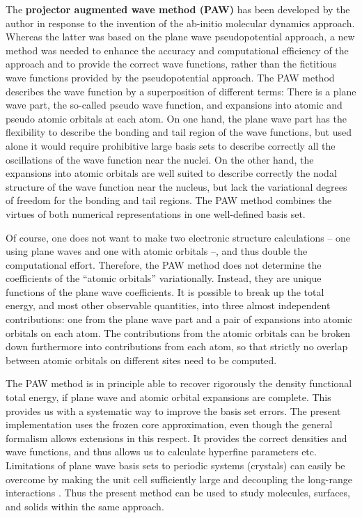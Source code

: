 \documentclass[final,12pt]{article}
\begin{document}
The {\bf projector augmented wave method (PAW)} \cite{PAW} has been
developed by the author in response to the invention of the ab-initio
molecular dynamics approach. Whereas the latter was based on the plane
wave pseudopotential approach, a new method was needed to enhance the
accuracy and computational efficiency of the approach and to provide
the correct wave functions, rather than the fictitious wave functions
provided by the pseudopotential approach.  The PAW method describes
the wave function by a superposition of different terms: There is a
plane wave part, the so-called pseudo wave function, and expansions
into atomic and pseudo atomic orbitals at each atom. On one hand, the
plane wave part has the flexibility to describe the bonding and tail
region of the wave functions, but used alone it would require
prohibitive large basis sets to describe correctly all the
oscillations of the wave function near the nuclei. On the other hand,
the expansions into atomic orbitals are well suited to describe
correctly the
nodal structure of the wave function near the nucleus, but
lack the variational degrees of freedom for the bonding and tail
regions.  The PAW method combines the virtues of both numerical
representations in one well-defined basis set.

Of course, one does not want to make two electronic structure
calculations  -- one using plane waves and one with atomic
orbitals --, and thus double the computational effort. Therefore, the
PAW method does not determine the coefficients of the ``atomic orbitals''
variationally. Instead, they are unique functions of the plane wave
coefficients. It is possible to break up the total energy, and most
other observable quantities, into three almost independent
contributions: one from the plane wave part and a pair of expansions
into atomic orbitals on each atom. The contributions from the atomic
orbitals can be broken down furthermore into contributions from each atom,
so that strictly no overlap between atomic orbitals on different sites
need to be computed.

The PAW method is in principle able to recover rigorously the density
functional total energy, if plane wave and atomic
orbital expansions are complete. This provides us with a systematic
way to improve the basis set errors.  The present implementation
uses the frozen core approximation, even though the general formalism
allows extensions in this respect. It provides the correct densities
and wave functions, and thus allows us to calculate hyperfine
parameters etc.  Limitations of plane wave basis sets to periodic
systems (crystals) can easily be overcome by making the unit cell
sufficiently large and decoupling the long-range
interactions \cite{Decouple}. Thus the present method can be used to
study molecules, surfaces, and solids within the same approach.
\end{document}
